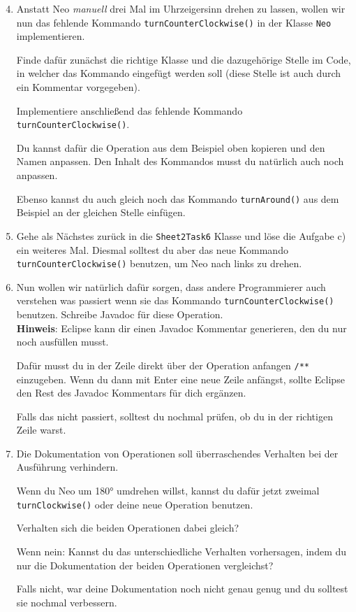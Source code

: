 \begin{enumerate} \setcounter{enumi}{3}
    \item Anstatt Neo \textit{manuell} drei Mal im Uhrzeigersinn drehen zu lassen, wollen wir nun das fehlende Kommando \lstinline{turnCounterClockwise()} in der Klasse \lstinline{Neo} implementieren.

        Finde dafür zunächst die richtige Klasse und die dazugehörige Stelle im Code, in welcher das Kommando eingefügt werden soll (diese Stelle ist auch durch ein Kommentar vorgegeben).

        Implementiere anschließend das fehlende Kommando \lstinline{turnCounterClockwise()}.
        
        Du kannst dafür die Operation aus dem Beispiel oben kopieren und den Namen anpassen.
        Den Inhalt des Kommandos musst du natürlich auch noch anpassen.

        Ebenso kannst du auch gleich noch das Kommando \lstinline{turnAround()} aus dem Beispiel an der gleichen Stelle einfügen.

    \item Gehe als Nächstes zurück in die \lstinline{Sheet2Task6} Klasse und löse die Aufgabe c) ein weiteres Mal.
        Diesmal solltest du aber das neue Kommando \lstinline{turnCounterClockwise()} benutzen, um Neo nach links zu drehen.
\end{enumerate}





\begin{enumerate}\setcounter{enumi}{5}
    \item Nun wollen wir natürlich dafür sorgen, dass andere Programmierer auch verstehen was passiert wenn sie das Kommando \lstinline{turnCounterClockwise()} benutzen.
        Schreibe Javadoc für diese Operation.\\

    \textbf{Hinweis}: Eclipse kann dir einen Javadoc Kommentar generieren, den du nur noch ausfüllen musst.

        Dafür musst du in der Zeile direkt über der Operation anfangen \lstinline{/**} einzugeben.
        Wenn du dann mit Enter eine neue Zeile anfängst, sollte Eclipse den Rest des Javadoc Kommentars für dich ergänzen.

        Falls das nicht passiert, solltest du nochmal prüfen, ob du in der richtigen Zeile warst.

    \item Die Dokumentation von Operationen soll überraschendes Verhalten bei der Ausführung verhindern.

        Wenn du Neo um 180° umdrehen willst, kannst du dafür jetzt zweimal \lstinline{turnClockwise()} oder deine neue Operation benutzen.

        Verhalten sich die beiden Operationen dabei gleich?

        Wenn nein: Kannst du das unterschiedliche Verhalten vorhersagen, indem du nur die Dokumentation der beiden Operationen vergleichst?

        Falls nicht, war deine Dokumentation noch nicht genau genug und du solltest sie nochmal verbessern.
\end{enumerate}


